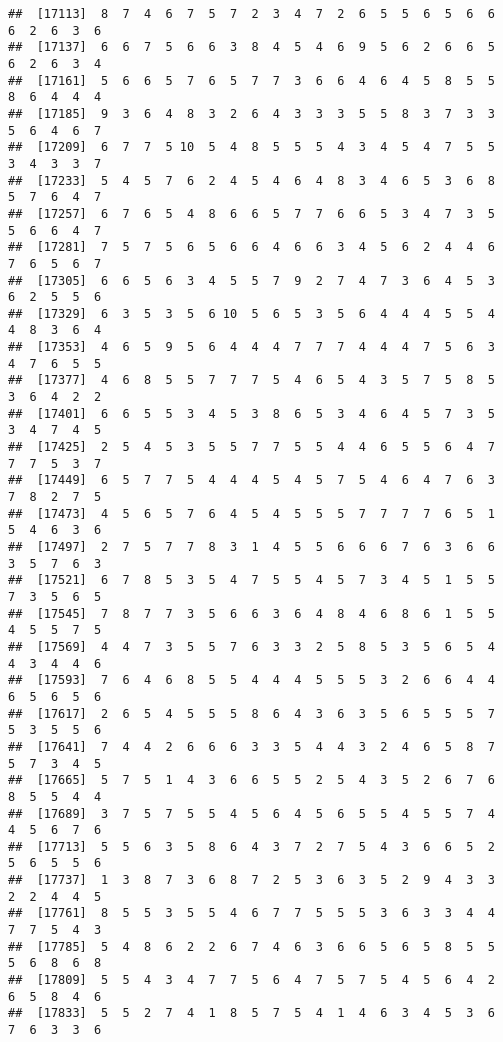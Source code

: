 \documentclass[
]{book}
\begin{document}
\begin{verbatim}
##  [17113]  8  7  4  6  7  5  7  2  3  4  7  2  6  5  5  6  5  6  6  6  2  6  3  6
##  [17137]  6  6  7  5  6  6  3  8  4  5  4  6  9  5  6  2  6  6  5  6  2  6  3  4
##  [17161]  5  6  6  5  7  6  5  7  7  3  6  6  4  6  4  5  8  5  5  8  6  4  4  4
##  [17185]  9  3  6  4  8  3  2  6  4  3  3  3  5  5  8  3  7  3  3  5  6  4  6  7
##  [17209]  6  7  7  5 10  5  4  8  5  5  5  4  3  4  5  4  7  5  5  3  4  3  3  7
##  [17233]  5  4  5  7  6  2  4  5  4  6  4  8  3  4  6  5  3  6  8  5  7  6  4  7
##  [17257]  6  7  6  5  4  8  6  6  5  7  7  6  6  5  3  4  7  3  5  5  6  6  4  7
##  [17281]  7  5  7  5  6  5  6  6  4  6  6  3  4  5  6  2  4  4  6  7  6  5  6  7
##  [17305]  6  6  5  6  3  4  5  5  7  9  2  7  4  7  3  6  4  5  3  6  2  5  5  6
##  [17329]  6  3  5  3  5  6 10  5  6  5  3  5  6  4  4  4  5  5  4  4  8  3  6  4
##  [17353]  4  6  5  9  5  6  4  4  4  7  7  7  4  4  4  7  5  6  3  4  7  6  5  5
##  [17377]  4  6  8  5  5  7  7  7  5  4  6  5  4  3  5  7  5  8  5  3  6  4  2  2
##  [17401]  6  6  5  5  3  4  5  3  8  6  5  3  4  6  4  5  7  3  5  3  4  7  4  5
##  [17425]  2  5  4  5  3  5  5  7  7  5  5  4  4  6  5  5  6  4  7  7  7  5  3  7
##  [17449]  6  5  7  7  5  4  4  4  5  4  5  7  5  4  6  4  7  6  3  7  8  2  7  5
##  [17473]  4  5  6  5  7  6  4  5  4  5  5  5  7  7  7  7  6  5  1  5  4  6  3  6
##  [17497]  2  7  5  7  7  8  3  1  4  5  5  6  6  6  7  6  3  6  6  3  5  7  6  3
##  [17521]  6  7  8  5  3  5  4  7  5  5  4  5  7  3  4  5  1  5  5  7  3  5  6  5
##  [17545]  7  8  7  7  3  5  6  6  3  6  4  8  4  6  8  6  1  5  5  4  5  5  7  5
##  [17569]  4  4  7  3  5  5  7  6  3  3  2  5  8  5  3  5  6  5  4  4  3  4  4  6
##  [17593]  7  6  4  6  8  5  5  4  4  4  5  5  5  3  2  6  6  4  4  6  5  6  5  6
##  [17617]  2  6  5  4  5  5  5  8  6  4  3  6  3  5  6  5  5  5  7  5  3  5  5  6
##  [17641]  7  4  4  2  6  6  6  3  3  5  4  4  3  2  4  6  5  8  7  5  7  3  4  5
##  [17665]  5  7  5  1  4  3  6  6  5  5  2  5  4  3  5  2  6  7  6  8  5  5  4  4
##  [17689]  3  7  5  7  5  5  4  5  6  4  5  6  5  5  4  5  5  7  4  4  5  6  7  6
##  [17713]  5  5  6  3  5  8  6  4  3  7  2  7  5  4  3  6  6  5  2  5  6  5  5  6
##  [17737]  1  3  8  7  3  6  8  7  2  5  3  6  3  5  2  9  4  3  3  2  2  4  4  5
##  [17761]  8  5  5  3  5  5  4  6  7  7  5  5  5  3  6  3  3  4  4  7  7  5  4  3
##  [17785]  5  4  8  6  2  2  6  7  4  6  3  6  6  5  6  5  8  5  5  5  6  8  6  8
##  [17809]  5  5  4  3  4  7  7  5  6  4  7  5  7  5  4  5  6  4  2  6  5  8  4  6
##  [17833]  5  5  2  7  4  1  8  5  7  5  4  1  4  6  3  4  5  3  6  7  6  3  3  6

\end{verbatim}
\end{document}
